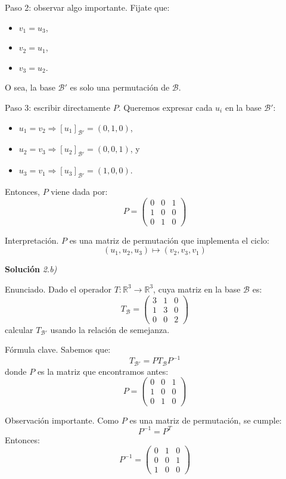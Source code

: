 \documentclass[11pt,spanish]{article}
\begin{document}
Paso 2: observar algo importante.
Fijate que:
\begin{itemize}
\item $v_1 = u_3$,
\item $v_2 = u_1$,
\item $v_3 = u_2$.
\end{itemize}
O sea, la base $\mathcal{B}'$ es solo una permutación de $\mathcal{B}$.

Paso 3: escribir directamente $P$.
Queremos expresar cada $u_i$ en la base $\mathcal{B}'$:
\begin{itemize}
\item $u_1 = v_2 \Rightarrow [u_1]_{\mathcal{B}'} = (0,1,0)$,
\item $u_2 = v_3 \Rightarrow [u_2]_{\mathcal{B}'} = (0,0,1)$, y
\item $u_3 = v_1 \Rightarrow [u_3]_{\mathcal{B}'} = (1,0,0)$.
\end{itemize}
Entonces, $P$ viene dada por:
$$
\boxed{
P =
\begin{pmatrix}
0 & 0 & 1 \\
1 & 0 & 0 \\
0 & 1 & 0
\end{pmatrix}
}
$$

Interpretación.
$P$ es una matriz de permutación que implementa el ciclo:
$$
(u_1, u_2, u_3) \mapsto (v_2, v_3, v_1)
$$

\vspace{0.5cm}
{\bf Soluci\'on }{\em 2.b)}
\vspace{0.5cm}

Enunciado.
Dado el operador $T:\mathbb{R}^3 \to \mathbb{R}^3$, cuya matriz en la base $\mathcal{B}$ es:
$$
T_{\mathcal{B}} =
\begin{pmatrix}
3 & 1 & 0 \\
1 & 3 & 0 \\
0 & 0 & 2
\end{pmatrix}
$$
calcular $T_{\mathcal{B}'}$ usando la relación de semejanza.

Fórmula clave.
Sabemos que:
$$
T_{\mathcal{B}'} = P T_{\mathcal{B}} P^{-1}
$$
donde $P$ es la matriz que encontramos antes:
$$
P =
\begin{pmatrix}
0 & 0 & 1 \\
1 & 0 & 0 \\
0 & 1 & 0
\end{pmatrix}
$$

Observación importante.
Como $P$ es una matriz de permutación, se cumple:
$$
P^{-1} = P^T
$$
Entonces:
$$
P^{-1} =
\begin{pmatrix}
0 & 1 & 0 \\
0 & 0 & 1 \\
1 & 0 & 0
\end{pmatrix}
$$
\end{document}

